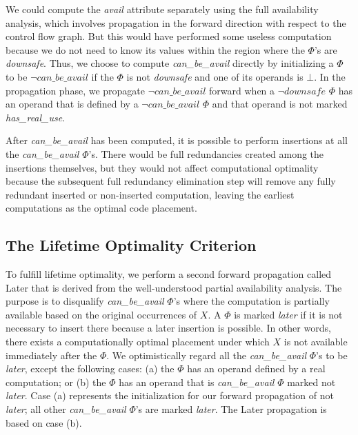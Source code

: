 We could compute the \emph{avail} attribute separately using the full
availability analysis, which involves propagation in the forward direction
with respect to the control flow graph.  But this would have performed some
useless computation because we do not need to know its values within the region 
where the $\Phi$'s are \emph{downsafe}.  Thus, we choose to compute
\emph{can\_be\_avail} directly by initializing a $\Phi$ to be 
$\neg can\_be\_avail$ if
the $\Phi$ is not \emph{downsafe} and one of its operands is $\bot$.
In the propagation phase, we propagate $\neg can\_be\_avail$ forward when
a $\neg downsafe$  $\Phi$ has an operand that is defined by a 
$\neg can\_be\_avail$ $\Phi$ and that operand is not marked \emph{has\_real\_use}.

After \emph{can\_be\_avail} has been computed, it is possible to perform 
insertions at
all the \emph{can\_be\_avail} $\Phi$'s.  There would be full redundancies
created among the insertions themselves, but they would not affect 
computational optimality because the subsequent full redundancy elimination 
step will remove any fully redundant inserted or non-inserted computation, 
leaving the earliest computations as the optimal code placement.

\subsection{The Lifetime Optimality Criterion}

To fulfill lifetime optimality, we perform a second forward propagation called
Later that is derived from the well-understood partial availability 
analysis.  The purpose is to disqualify \emph{can\_be\_avail} $\Phi$'s where
the computation is
partially available based on the original occurrences of $X$.
A $\Phi$ is marked \emph{later} if it is not necessary to insert there because
a later insertion is possible.  In other words, there exists a computationally
optimal placement under which $X$ is not available immediately after the $\Phi$.
We optimistically regard all the
\emph{can\_be\_avail} $\Phi$'s to be \emph{later}, except the following cases:
(a) the $\Phi$ has an operand defined by a real computation; or (b) the $\Phi$
has an operand that is \emph{can\_be\_avail} $\Phi$ marked not \emph{later}.  Case (a) represents
the initialization for our forward propagation of not \emph{later}; all other
\emph{can\_be\_avail} $\Phi$'s are marked \emph{later}.  The Later
propagation is based on case (b).

